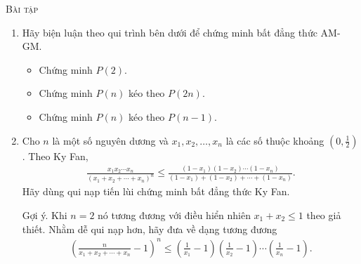 \documentclass[12pt]{article} %
\newcounter{myproblem} %
\newenvironment{myproblem}[1][]{%
    \vspace{10pt} %
    \noindent\textsc{Bài tập #1} %
    \noindent
}{%
    \par
    \vspace{10pt} %
}
\begin{document}
\begin{myproblem}
\begin{enumerate}
    \item Hãy biện luận theo qui trình bên dưới để chứng minh bất đẳng thức AM-GM.
    \begin{itemize}
        \item Chứng minh \(P(2)\).
        \item Chứng minh \(P(n)\) kéo theo \(P(2n)\).
        \item Chứng minh \(P(n)\) kéo theo \(P(n-1)\).
    \end{itemize}
    \item Cho \(n\) là một số nguyên dương và \(x_1,x_2,\dots,x_n\) là các số thuộc khoảng \(\left(0,\frac{1}{2}\right)\). Theo Ky Fan, 
    \begin{align*}
        \frac{x_1x_2\cdots x_n}{(x_1+x_2+\cdots+x_n)^n}\leq\frac{(1-x_1)(1-x_2)\cdots(1-x_n)}{(1-x_1)+(1-x_2)+\cdots+(1-x_n)}.
    \end{align*}
    Hãy dùng qui nạp tiến lùi chứng minh bất đẳng thức Ky Fan.

    Gợi ý. Khi \(n=2\) nó tương đương với điều hiển nhiên \(x_1+x_2\leq 1\) theo giả thiết. Nhằm dễ qui nạp hơn, hãy đưa về dạng tương đương 
    \begin{align*}
        \left(\frac{n}{x_1+x_2+\cdots+x_n}-1\right)^n\leq\left(\frac{1}{x_1}-1\right)\left(\frac{1}{x_2}-1\right)\cdots\left(\frac{1}{x_n}-1\right).
    \end{align*}
\end{enumerate}
\end{myproblem}
\cite{BradleySandifer2009}
\printbibliography
\end{document}

